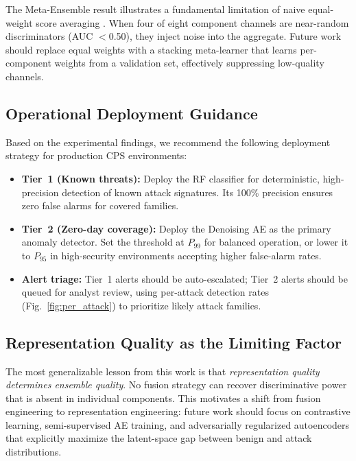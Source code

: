 \documentclass[10pt,journal,compsoc]{IEEEtran}
\begin{document}
The Meta-Ensemble result illustrates a fundamental limitation of
naive equal-weight score averaging \cite{dietterich2000}.  When four
of eight component channels are near-random discriminators (AUC
$<$0.50), they inject noise into the aggregate.  Future work should
replace equal weights with a stacking meta-learner that learns
per-component weights from a validation set, effectively suppressing
low-quality channels.

\subsection{Operational Deployment Guidance}

Based on the experimental findings, we recommend the following
deployment strategy for production CPS environments:

\begin{itemize}[leftmargin=*,noitemsep]
  \item \textbf{Tier~1 (Known threats):} Deploy the RF classifier
    for deterministic, high-precision detection of known attack
    signatures.  Its 100\% precision ensures zero false alarms for
    covered families.
  \item \textbf{Tier~2 (Zero-day coverage):} Deploy the Denoising
    AE as the primary anomaly detector.  Set the threshold at $P_{99}$
    for balanced operation, or lower it to $P_{95}$ in high-security
    environments accepting higher false-alarm rates.
  \item \textbf{Alert triage:} Tier~1 alerts should be auto-escalated;
    Tier~2 alerts should be queued for analyst review, using
    per-attack detection rates (Fig.~\ref{fig:per_attack}) to
    prioritize likely attack families.
\end{itemize}

\subsection{Representation Quality as the Limiting Factor}

The most generalizable lesson from this work is that
\emph{representation quality determines ensemble quality}.  No fusion
strategy can recover discriminative power that is absent in individual
components.  This motivates a shift from fusion engineering to
representation engineering: future work should focus on contrastive
learning, semi-supervised AE training, and adversarially regularized
autoencoders that explicitly maximize the latent-space gap between
benign and attack distributions.
\end{document}
